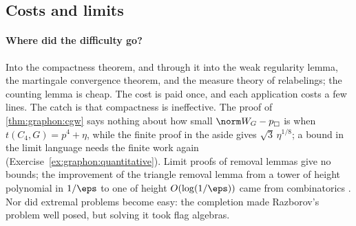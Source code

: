 \begin{refsection}
\section{Costs and limits}\label{sec:graphon:costs}

\paragraph{Where did the difficulty go?} Into the compactness theorem, and through it into the weak regularity lemma, the martingale convergence theorem, and the measure theory of relabelings; the counting lemma is cheap. The cost is paid once, and each application costs a few lines. The catch is that compactness is ineffective. The proof of \cref{thm:graphon:cgw} says nothing about how small $\graphoncut{W_G-p}$ is when $t(C_4,G)=p^4+\eta$, while the finite proof in the aside gives $\sqrt3\,\eta^{1/8}$; a bound in the limit language needs the finite work again (Exercise~\ref{ex:graphon:quantitative}). Limit proofs of removal lemmas give no bounds; the improvement of the triangle removal lemma from a tower of height polynomial in $1/\eps$ to one of height $O(\log(1/\eps))$ came from combinatorics \parencite{Fox2011}. Nor did extremal problems become easy: the completion made Razborov's problem well posed, but solving it took flag algebras.


\end{refsection}
